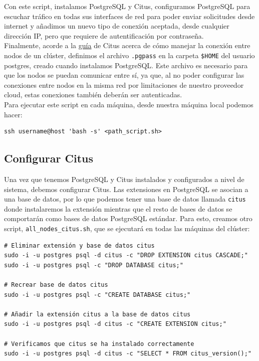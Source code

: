 Con este script, instalamos PostgreSQL y Citus, configuramos PostgreSQL para escuchar tráfico en todas sus interfaces de red para poder enviar solicitudes desde internet y añadimos un nuevo tipo de conexión aceptada, desde cualquier dirección IP, pero que requiere de autentificación por contraseña. \\

Finalmente, acorde a la \href{https://docs.citusdata.com/en/v8.3/admin_guide/cluster_management.html#increasing-worker-security}{guía} de Citus acerca de cómo manejar la conexión entre nodos de un clúster, definimos el archivo \texttt{.pgpass} en la carpeta \texttt{\$HOME} del usuario postgres, creado cuando instalamos PostgreSQL. Este archivo es necesario para que los nodos se puedan comunicar entre sí, ya que, al no poder configurar las conexiones entre nodos en la misma red por limitaciones de nuestro proveedor cloud, estas conexiones también deberán ser autenticadas. \\

\noindent Para ejecutar este script en cada máquina, desde nuestra máquina local podemos hacer:
\begin{verbatim}
ssh username@host 'bash -s' <path_script.sh>
\end{verbatim}

\subsection*{Configurar Citus}

Una vez que tenemos PostgreSQL y Citus instalados y configurados a nivel de sistema, debemos configurar Citus. Las extensiones en PostgreSQL se asocian a una base de datos, por lo que podemos tener una base de datos llamada \texttt{citus} donde instalaremos la extensión mientras que el resto de bases de datos se comportarán como bases de datos PostgreSQL estándar. Para esto, creamos otro script, \texttt{all\_nodes\_citus.sh}, que se ejecutará en todas las máquinas del clúster:

\begin{verbatim}
# Eliminar extensión y base de datos citus
sudo -i -u postgres psql -d citus -c "DROP EXTENSION citus CASCADE;"
sudo -i -u postgres psql -c "DROP DATABASE citus;"

# Recrear base de datos citus
sudo -i -u postgres psql -c "CREATE DATABASE citus;"

# Añadir la extensión citus a la base de datos citus
sudo -i -u postgres psql -d citus -c "CREATE EXTENSION citus;"

# Verificamos que citus se ha instalado correctamente
sudo -i -u postgres psql -d citus -c "SELECT * FROM citus_version();"
\end{verbatim}


